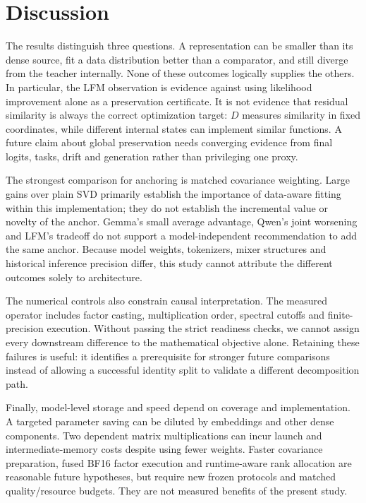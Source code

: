 \documentclass[10pt]{article}
\begin{document}
\section{Discussion}

The results distinguish three questions. A representation can be smaller than its dense source, fit a data distribution better than a comparator, and still diverge from the teacher internally. None of these outcomes logically supplies the others. In particular, the LFM observation is evidence against using likelihood improvement alone as a preservation certificate. It is not evidence that residual similarity is always the correct optimization target: $D$ measures similarity in fixed coordinates, while different internal states can implement similar functions. A future claim about global preservation needs converging evidence from final logits, tasks, drift and generation rather than privileging one proxy.

The strongest comparison for anchoring is matched covariance weighting. Large gains over plain SVD primarily establish the importance of data-aware fitting within this implementation; they do not establish the incremental value or novelty of the anchor. Gemma's small average advantage, Qwen's joint worsening and LFM's tradeoff do not support a model-independent recommendation to add the same anchor. Because model weights, tokenizers, mixer structures and historical inference precision differ, this study cannot attribute the different outcomes solely to architecture.

The numerical controls also constrain causal interpretation. The measured operator includes factor casting, multiplication order, spectral cutoffs and finite-precision execution. Without passing the strict readiness checks, we cannot assign every downstream difference to the mathematical objective alone. Retaining these failures is useful: it identifies a prerequisite for stronger future comparisons instead of allowing a successful identity split to validate a different decomposition path.

Finally, model-level storage and speed depend on coverage and implementation. A targeted parameter saving can be diluted by embeddings and other dense components. Two dependent matrix multiplications can incur launch and intermediate-memory costs despite using fewer weights. Faster covariance preparation, fused BF16 factor execution and runtime-aware rank allocation are reasonable future hypotheses, but require new frozen protocols and matched quality/resource budgets. They are not measured benefits of the present study.
\end{document}

